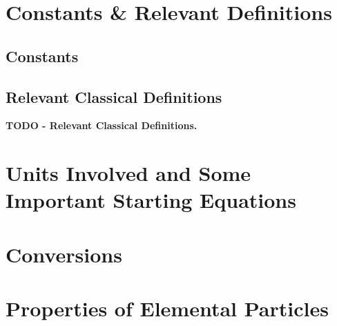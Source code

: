 \documentclass[colorlinks,11pt,a4paper,normalphoto,withhyper,ragged2e]{altareport}
\begin{document}
	
	

	\section{Constants \& Relevant Definitions}
		
		\subsection{Constants}
			
			
		
		
		\subsection{Relevant Classical Definitions}
			
			\textbf{\LARGE\color{heading}TODO - Relevant Classical Definitions.} %
			
			
			
			
			
			\pagebreak
	
	
	
	
	\section{Units Involved and Some Important Starting Equations}
		
		
		
		
		\bigskip
	
	
	
	
	\section{Conversions}
		
		
		
		
		\pagebreak
	
	
	
	
	
	\section{Properties of Elemental Particles}
		
\end{document}
